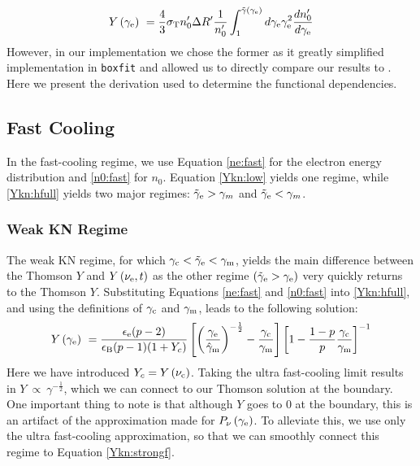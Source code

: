\documentclass[fleqn,usenatbib]{mnras}
\begin{document}
\begin{equation}
\label{Ykn:hfull}
    Y\left(\gamma_{\rm e}\right) \ = \frac{4}{3}\sigma_{\rm T} n_0^{\prime} \Delta R^{\prime}  \frac{1}{n_0^{\prime}}\int_{1}^{\Tilde{\gamma}\left(\gamma_{\rm e}\right)} d\gamma_{\rm e}\gamma_{\rm e}^{2} \frac{d n_0^{\prime}}{d\gamma_{\rm e}}
\end{equation}
However, in our implementation we chose the former as it greatly simplified implementation in \texttt{boxfit} and allowed us to directly compare our results to \citet{Nakar}. Here we present the derivation used to determine the functional dependencies.

\subsection{Fast Cooling}

In the fast-cooling regime, we use Equation \ref{ne:fast} for the electron energy distribution and \ref{n0:fast} for $n_0$. Equation \ref{Ykn:low} yields one regime, while \ref{Ykn:hfull} yields two major regimes: $\tilde{\gamma}_{\rm e} > \gamma_{m}$ and $\tilde{\gamma}_{\rm e} < \gamma_{m}$.

\subsubsection{Weak KN Regime}

The weak KN regime, for which $\gamma_{\rm{c}} < \tilde{\gamma}_{\rm{e}} < \gamma_{\rm{m}}$, yields the main difference between the Thomson $Y$ and $Y\left(\nu_{\rm e},t\right)$ as the other regime $\left( \tilde{\gamma}_{\rm e} > \gamma_{\rm e} \right)$ very quickly returns to the Thomson $Y$. Substituting Equations \ref{ne:fast} and \ref{n0:fast} into \ref{Ykn:hfull}, and using the definitions of $\gamma_{\rm c}$ and $\gamma_{\rm m}$, leads to the following solution:
\begin{equation}
\label{Ykn:hifast}
    Y\left(\gamma_{\rm e}\right) \ = \frac{\epsilon_{\rm e} (p-2)}{\epsilon_{\rm B} (p-1)(1+Y_c)} \left[\left(\frac{\gamma_{\rm e}}{\hat{\gamma}_{\rm m}}\right)^{-\frac{1}{2}}-\frac{\gamma_{\rm c}}{\gamma_{\rm m}}\right]\left[1-\frac{1-p}{p}\frac{\gamma_{\rm c}}{\gamma_{\rm m}}\right]^{-1}
\end{equation}
Here we have introduced $Y_c=Y\left( \nu_{\rm c}\right)$. Taking the ultra fast-cooling limit results in $Y\ \propto \ \gamma^{-\frac{1}{2}}$, which we can connect to our Thomson solution at the boundary. One important thing to note is that although $Y$ goes to 0 at the boundary, this is an artifact of the approximation made for $P_{\nu}\left(\gamma_{\rm e}\right)$. To alleviate this, we use only the ultra fast-cooling approximation, so that we can smoothly connect this regime to Equation \ref{Ykn:strongf}.
\end{document}

